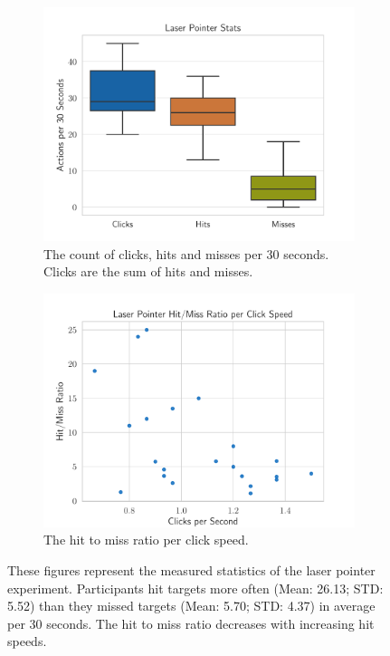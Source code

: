 \begin{figure}[H]
	\centering
	\begin{subfigure}[t]{.48\linewidth}%
		\centering
		\includegraphics[width=\linewidth]{figures/evaluation/eval_exp_lp.pdf}
		\caption{The count of clicks, hits and misses per 30 seconds. Clicks are the sum of hits and misses.}\label{fig:eval-exp-lp}
	\end{subfigure}%
	\hspace{0.02\linewidth}%
	\begin{subfigure}[t]{.48\linewidth}%
		\centering
		\includegraphics[width=\linewidth]{figures/evaluation/eval_exp_lp_ratio_scatter.pdf}
		\caption{The hit to miss ratio per click speed.}\label{fig:eval-exp-lp-ratio-scatter} %
	\end{subfigure}%
	\caption[Laser pointer task results]{These figures represent the measured statistics of the laser pointer experiment. Participants hit targets more often (Mean: 26.13; \gls{STD}: 5.52) than they missed targets (Mean: 5.70; \gls{STD}: 4.37) in average per 30 seconds. The hit to miss ratio decreases with increasing hit speeds.}\label{fig:exp-lp-eval}
\end{figure}


